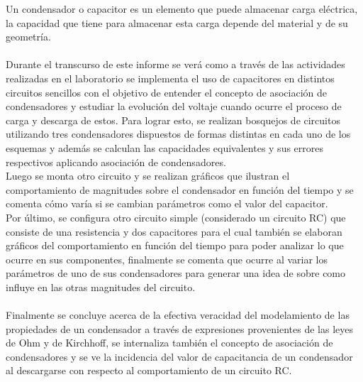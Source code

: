 \documentclass[letterpaper,11pt]{article} %
\begin{document}
	



\begin{resumen}
	Un condensador o capacitor es un elemento que puede almacenar carga eléctrica, la capacidad que tiene para almacenar esta carga depende del material y de su geometría.\\\\ Durante el transcurso de este informe se verá como a través de las actividades realizadas en el laboratorio se implementa el uso de capacitores en distintos circuitos sencillos con el objetivo de entender el concepto de asociación de condensadores y estudiar la evolución del voltaje cuando ocurre el proceso de carga y descarga de estos. Para lograr esto, se realizan bosquejos de circuitos utilizando tres condensadores dispuestos de formas distintas en cada uno de los esquemas y además se calculan las capacidades equivalentes y sus errores respectivos aplicando asociación de condensadores.\\Luego se monta otro circuito y se realizan gráficos que ilustran el comportamiento de magnitudes sobre el condensador en función del tiempo y se comenta cómo varía si se cambian parámetros como el valor del capacitor.\\ Por último, se configura otro circuito simple (considerado un circuito RC) que consiste de una resistencia y dos capacitores para el cual también se elaboran gráficos del comportamiento en función del tiempo para poder analizar lo que ocurre en sus componentes, finalmente se comenta que ocurre al variar los parámetros de uno de sus condensadores para generar una idea de sobre como influye en las otras magnitudes del circuito.\\\\
	Finalmente se concluye acerca de la efectiva veracidad del modelamiento de las propiedades de un condensador a través de expresiones provenientes de las leyes de Ohm y de Kirchhoff, se internaliza también el concepto de asociación de condensadores y se ve la incidencia del valor de capacitancia de un condensador al descargarse con respecto al comportamiento de un circuito RC.
\end{resumen}



\end{document}
